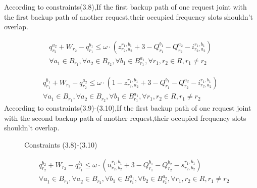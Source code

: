 \documentclass[a4paper,11pt]{report}
\begin{document}
\begin{itemize}
    According to constraints(3.8),If the first backup path of one request joint with the first backup path of another request,their occupied frequency slots shouldn’t overlap.

     \begin{equation}
     \begin{split}
        &q^{a_2}_{r_2}+W^{}_{r_2}-q^{b_1}_{r_1} \leq\omega\cdot(z^{r_1,b^{}_1}_{r_2,a^{}_2}+3-Q^{b_1}_{r_1}-Q^{a_2}_{r_2}-i^{r_1,b^{}_1}_{r_2,a^{}_2}) 
        \quad\\
        &\forall{a^{}_1\in B^{}_{r_1}},\forall{a^{}_2\in B^{}_{r_2}}, \forall{b^{}_1 \in B^{a^{}_1}_{r_1}}, \forall{r_1,r_2\in R,r_1\neq r_2} \label{ilp-st}
    \end{split}
    \end{equation}

    \begin{equation}
    \begin{split}
        &q^{b_1}_{r_1}+W^{}_{r_1}-q^{a_2}_{r_2} \leq\omega\cdot(1-z^{r_1,b^{}_1}_{r_2,a^{}_2}+3-Q^{b_1}_{r_1}-Q^{a_2}_{r_2}-i^{r_1,b^{}_1}_{r_2,a^{}_2}) \quad\\
        &\forall{a^{}_1\in B^{}_{r_1}},\forall{a^{}_2\in B^{}_{r_2}},\forall{b^{}_1 \in B^{a^{}_1}_{r_1}},\forall{r_1,r_2\in R,r_1\neq r_2} \label{ilp-st}
    \end{split}
    \end{equation}
    According to constraints(3.9)-(3.10),If the first backup path of one request joint with the second backup path of another request,their occupied frequency slots shouldn’t overlap.

    \begin{figure}[htbp]
        \begin{center}
        \end{center}
        \caption{Constraints (3.8)-(3.10)}
        \label{figure:Constraints (3.8)-(3.10)}
        \end{figure}
        
    \begin{equation}
    \begin{split}
        &q^{b_2}_{r_2}+W^{}_{r_2}-q^{b_1}_{r_1} \leq\omega\cdot(u^{r_1,b^{}_1}_{r_2,b^{}_2}+3-Q^{b_1}_{r_1}-Q^{b_2}_{r_2}-s^{r_1,b^{}_1}_{r_2,b^{}_2})\quad\\ 
        &\forall{a^{}_1\in B^{}_{r_1}},\forall{a^{}_2\in B^{}_{r_2}},\forall{b^{}_1 \in B^{a^{}_1}_{r_1}},\forall{b^{}_2 \in B^{a^{}_2}_{r_2}},\forall{r_1,r_2\in R,r_1\neq r_2}
        \label{ilp-st}
    \end{split}
    \end{equation}
    

\end{itemize}
\end{document}
